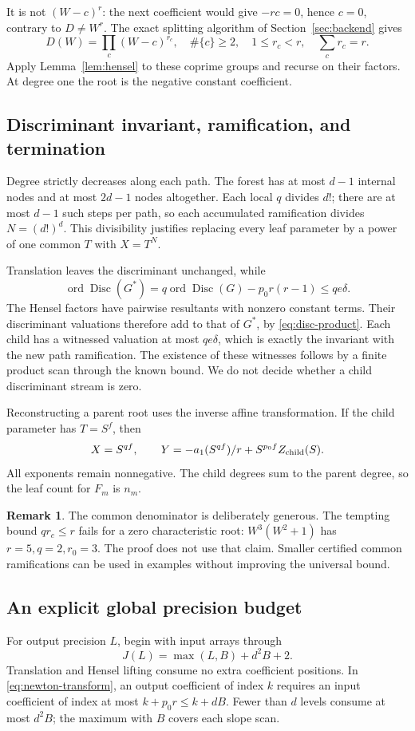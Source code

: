 \documentclass[11pt]{article}
\theoremstyle{definition}
\newtheorem{remark}[theorem]{Remark}
\newcommand{\ord}{\operatorname{ord}}
\newcommand{\disc}{\operatorname{Disc}}
\begin{document}
It is not \((W-c)^r\): the next coefficient would give \(-rc=0\), hence
\(c=0\), contrary to \(D\ne W^r\).
The exact splitting algorithm of Section~\ref{sec:backend} gives
\[
 D(W)=\prod_c(W-c)^{r_c},
 \quad \#\{c\}\ge2,\quad 1\le r_c<r,\quad \sum_c r_c=r.
\]
Apply Lemma~\ref{lem:hensel} to these coprime groups and recurse on their
factors. At degree one the root is the negative constant coefficient.

\subsection{Discriminant invariant, ramification, and termination}
Degree strictly decreases along each path. The forest has at most \(d-1\)
internal nodes and at most \(2d-1\) nodes altogether.
Each local \(q\) divides \(d!\); there are at most \(d-1\) such steps per
path, so each accumulated ramification divides \(N=(d!)^d\).
This divisibility justifies replacing every leaf parameter by a power of
one common \(T\) with \(X=T^N\).

Translation leaves the discriminant unchanged, while
\[
 \ord\disc(G^*)=q\ord\disc(G)-p_0r(r-1)\le qe\delta.
\]
The Hensel factors have pairwise resultants with nonzero constant terms.
Their discriminant valuations therefore add to that of \(G^*\), by
\eqref{eq:disc-product}. Each child has a witnessed valuation at most
\(qe\delta\), which is exactly the invariant with the new path
ramification. The existence of these witnesses follows by a finite product
scan through the known bound. We do not decide whether a child
discriminant stream is zero.

Reconstructing a parent root uses the inverse affine transformation.
If the child parameter has \(T=S^f\), then
\[
 X=S^{qf},\qquad
 Y=-a_1(S^{qf})/r+S^{p_0f}Z_{\rm child}(S).
\]
All exponents remain nonnegative. The child degrees sum to the parent
degree, so the leaf count for \(F_m\) is \(n_m\).

\begin{remark}
The common denominator is deliberately generous. The tempting bound
\(q r_c\le r\) fails for a zero characteristic root:
\(W^3(W^2+1)\) has \(r=5,q=2,r_0=3\).
The proof does not use that claim. Smaller certified common ramifications
can be used in examples without improving the universal bound.
\end{remark}

\subsection{An explicit global precision budget}
\label{subsec:precision}
For output precision \(L\), begin with input arrays through
\begin{equation}
 J(L)=\max(L,B)+d^2B+2.
 \label{eq:lookahead}
\end{equation}
Translation and Hensel lifting consume no extra coefficient positions.
In \eqref{eq:newton-transform}, an output coefficient of index \(k\)
requires an input coefficient of index at most \(k+p_0r\le k+dB\).
Fewer than \(d\) levels consume at most \(d^2B\); the maximum with \(B\)
covers each slope scan.
\end{document}
